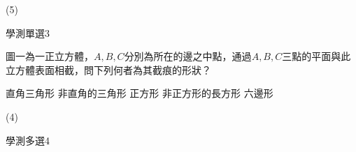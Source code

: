 \begin{QUESTIONS}
\begin{QUESTION}
        \begin{QTAGS}\end{QTAGS}
        \begin{QANS}
            (5)
        \end{QANS}
        \begin{QSOLLIST}
        \end{QSOLLIST}
        \begin{QEMPTYSPACE}
        \end{QEMPTYSPACE}
    \end{QUESTION}
    \begin{QUESTION}
        \begin{ExamInfo}{88}{學測}{單選}{3}
        \end{ExamInfo}
        \begin{ExamAnsRateInfo}{}{}{}{}
        \end{ExamAnsRateInfo}
        \begin{QBODY}
            圖一為一正立方體，$A,B,C$分別為所在的邊之中點，通過$A,B,C$三點的平面與此立方體表面相截，問下列何者為其截痕的形狀？
            \begin{QOPS}
                \QOP 直角三角形
                \QOP 非直角的三角形
                \QOP 正方形
                \QOP 非正方形的長方形
                \QOP 六邊形
            \end{QOPS}
        \end{QBODY}
        \begin{QFROMS}
        \end{QFROMS}
        \begin{QTAGS}\end{QTAGS}
        \begin{QANS}
            (4)
        \end{QANS}
        \begin{QSOLLIST}
        \end{QSOLLIST}
        \begin{QEMPTYSPACE}
        \end{QEMPTYSPACE}
    \end{QUESTION}
\end{QUESTIONS}\begin{QUESTIONS}
    \begin{QUESTION}
        \begin{ExamInfo}{88}{學測}{多選}{4}
        \end{ExamInfo}
        \begin{ExamAnsRateInfo}{}{}{}{}
        \end{ExamAnsRateInfo}

\end{QUESTION}
\end{QUESTIONS}
